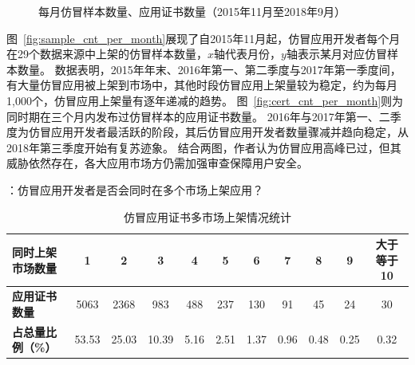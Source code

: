 \begin{figure}[t]
    \centering
    \hfill

    \hfill
    \caption{每月仿冒样本数量、应用证书数量（2015年11月至2018年9月）}
    \label{fig:fake_cnt_per_month}
\end{figure}

图~\autoref{fig:sample_cnt_per_month}展现了自2015年11月起，仿冒应用开发者每个月在29个数据来源中上架的仿冒样本数量，$x$轴代表月份，$y$轴表示某月对应仿冒样本数量。
数据表明，2015年年末、2016年第一、第二季度与2017年第一季度间，有大量仿冒应用被上架到市场中，其他时段仿冒应用上架量较为稳定，约为每月1,000个，仿冒应用上架量有逐年递减的趋势。
图~\autoref{fig:cert_cnt_per_month}则为同时期在三个月内发布过仿冒样本的应用证书数量。
2016年与2017年第一、二季度为仿冒应用开发者最活跃的阶段，其后仿冒应用开发者数量骤减并趋向稳定，从2018年第三季度开始有复苏迹象。
结合两图，作者认为仿冒应用高峰已过，但其威胁依然存在，各大应用市场方仍需加强审查保障用户安全。

：仿冒应用开发者是否会同时在多个市场上架应用？

\begin{table}[htbp]
    \renewcommand{\arraystretch}{1}
    \footnotesize
    \centering
    \caption{仿冒应用证书多市场上架情况统计}
    \vspace{1mm}
    \begin{tabular}{l cccccccccc}
        \toprule
        {\bf 同时上架市场数量} & 1     & 2     & 3     & 4    & 5    & 6    & 7    & 8    & 9    & 大于等于10 \\
        \midrule
        {\bf 应用证书数量}     & 5063  & 2368  & 983   & 488  & 237  & 130  & 91   & 45   & 24   & 30         \\
        {\bf 占总量比例（\%）} & 53.53 & 25.03 & 10.39 & 5.16 & 2.51 & 1.37 & 0.96 & 0.48 & 0.25 & 0.32       \\
        \bottomrule
    \end{tabular}
    \label{table:multi_market_statistic}
\end{table}


